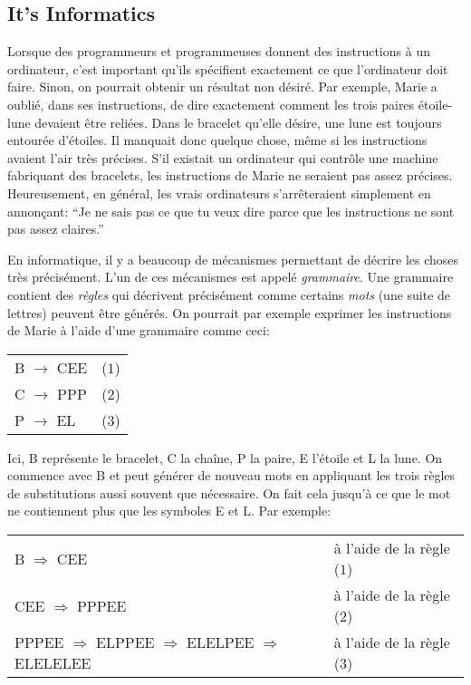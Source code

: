 \documentclass[a4paper,11pt]{report}
\makeatletter
\renewenvironment{adjustwidth}[2]{%
    \begin{list}{}{%
    \partopsep\z@%
    \topsep\z@%
    \listparindent\parindent%
    \parsep\parskip%
    \@ifmtarg{#1}{\setlength{\leftmargin}{\z@}}%
                 {\setlength{\leftmargin}{#1}}%
    \@ifmtarg{#2}{\setlength{\rightmargin}{\z@}}%
                 {\setlength{\rightmargin}{#2}}%
    }
    \item[]}{\end{list}}
\makeatother
\begin{document}
\subsection*{It’s Informatics}

Lorsque des programmeurs et programmeuses donnent des instructions à un ordinateur, c’est important qu’ils spécifient exactement ce que l’ordinateur doit faire. Sinon, on pourrait obtenir un résultat non désiré. Par exemple, Marie a oublié, dans ses instructions, de dire exactement comment les trois paires étoile-lune devaient être reliées. Dans le bracelet qu’elle désire, une lune est toujours entourée d’étoiles. Il manquait donc quelque chose, même si les instructions avaient l’air très précises. S’il existait un ordinateur qui contrôle une machine fabriquant des bracelets, les instructions de Marie ne seraient pas assez précises. Heureusement, en général, les vrais ordinateurs s’arrêteraient simplement en annonçant: “Je ne sais pas ce que tu veux dire parce que les instructions ne sont pas assez claires.”

En informatique, il y a beaucoup de mécanismes permettant de décrire les choses très précisément. L’un de ces mécanismes est appelé \emph{grammaire}. Une grammaire contient des \emph{règles} qui décrivent précisément comme certains \emph{mots} (une suite de lettres) peuvent être générés. On pourrait par exemple exprimer les instructions de Marie à l’aide d’une grammaire comme ceci:

\begin{adjustwidth}{1.5em}{0em}
\begin{tabular}{ @{} l l @{} }
  B \ensuremath{\rightarrow} CEE & ($1$) \\ 
  C \ensuremath{\rightarrow} PPP & ($2$) \\ 
  P \ensuremath{\rightarrow} EL & ($3$)
\end{tabular}


\end{adjustwidth}

Ici, B représente le bracelet, C la chaîne, P la paire, E l’étoile et L la lune. On commence avec B et peut générer de nouveau mots en appliquant les trois règles de substitutions aussi souvent que nécessaire. On fait cela jusqu’à ce que le mot ne contiennent plus que les symboles E et L. Par exemple:

\begin{adjustwidth}{1.5em}{0em}
\begin{tabular}{ @{} l l @{} }
  B \ensuremath{\Rightarrow} CEE & à l’aide de la règle ($1$) \\ 
  CEE \ensuremath{\Rightarrow} PPPEE & à l’aide de la règle ($2$) \\ 
  PPPEE \ensuremath{\Rightarrow} ELPPEE \ensuremath{\Rightarrow} ELELPEE \ensuremath{\Rightarrow} ELELELEE & à l’aide de la règle ($3$)
\end{tabular}


\end{adjustwidth}
\end{document}
